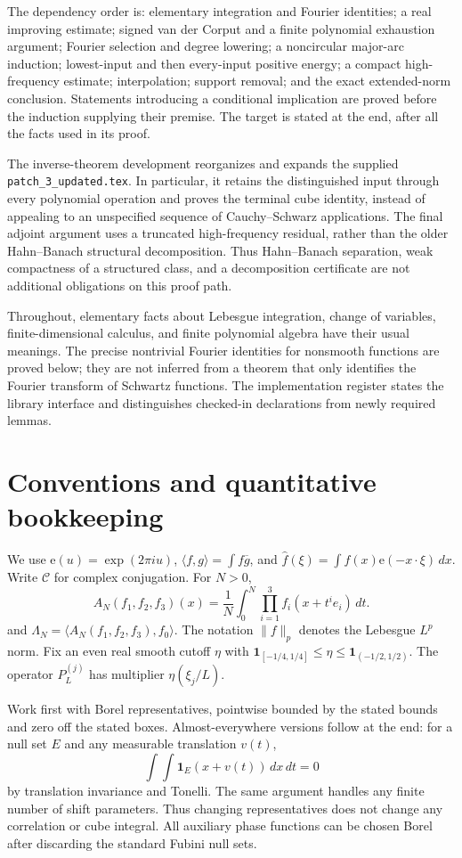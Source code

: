 \documentclass[11pt]{article}
\theoremstyle{definition}
\newcommand{\ee}[1]{\mathrm e\!\left(#1\right)}
\newcommand{\pid}[1]{\nolinkurl{#1}}
\begin{document}
The dependency order is: elementary integration and Fourier identities; a real improving estimate;
signed van der Corput and a finite polynomial exhaustion argument; Fourier selection and degree lowering;
a noncircular major-arc induction; lowest-input and then every-input positive energy;
a compact high-frequency estimate; interpolation; support removal; and the exact extended-norm conclusion.
Statements introducing a conditional implication are proved before the induction supplying their premise.
The target is stated at the end, after all the facts used in its proof.

The inverse-theorem development reorganizes and expands the supplied \pid{patch_3_updated.tex}.
In particular, it retains the distinguished input through every polynomial operation and proves the
terminal cube identity, instead of appealing to an unspecified sequence of Cauchy--Schwarz applications.
The final adjoint argument uses a truncated high-frequency residual, rather than the older
Hahn--Banach structural decomposition. Thus Hahn--Banach separation, weak compactness of a
structured class, and a decomposition certificate are not additional obligations on this proof path.

Throughout, elementary facts about Lebesgue integration, change of variables, finite-dimensional
calculus, and finite polynomial algebra have their usual meanings. The precise nontrivial Fourier
identities for nonsmooth functions are proved below; they are not inferred from a theorem that only
identifies the Fourier transform of Schwartz functions. The implementation register states the
library interface and distinguishes checked-in declarations from newly required lemmas.


\section{Conventions and quantitative bookkeeping}\label{patch:conventions}
We use $\ee u=\exp(2\pi i u)$, $\langle f,g\rangle=\int f\overline g$, and
$\widehat f(\xi)=\int f(x)\ee{-x\cdot\xi}\,dx$.  Write $\mathcal C$ for complex conjugation.
For $N>0$,
\[
 A_N(f_1,f_2,f_3)(x)=\frac1N\int_0^N\prod_{i=1}^3f_i(x+t^ie_i)\,dt.
\]
and $\Lambda_N=\langle A_N(f_1,f_2,f_3),f_0\rangle$.
The notation $\|f\|_p$ denotes the Lebesgue $L^p$ norm.
Fix an even real smooth cutoff $\eta$ with
$\mathbf1_{[-1/4,1/4]}\leq\eta\leq\mathbf1_{(-1/2,1/2)}$.
The operator $P_L^{(j)}$ has multiplier $\eta(\xi_j/L)$.

Work first with Borel representatives, pointwise bounded by the stated bounds and zero off
the stated boxes.  Almost-everywhere versions follow at the end: for a null set $E$ and any
measurable translation $v(t)$,
\[
 \int\!\int\mathbf1_E(x+v(t))\,dx\,dt=0
\]
by translation invariance and Tonelli.  The same argument handles any finite number of shift
parameters.  Thus changing representatives does not change any correlation or cube integral.
All auxiliary phase functions can be chosen Borel after discarding the standard Fubini null
sets.
\end{document}
